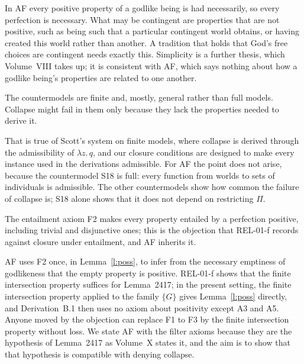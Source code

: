 \documentclass{situationist-preprint}
\begin{document}
\begin{reply}
In AF every positive property of a godlike being is had necessarily, so every perfection is necessary. What may be contingent are properties that are not positive, such as being such that a particular contingent world obtains, or having created this world rather than another. A tradition that holds that God's free choices are contingent needs exactly this. Simplicity is a further thesis, which Volume~VIII takes up; it is consistent with AF, which says nothing about how a godlike being's properties are related to one another.
\end{reply}

\begin{objection}
The countermodels are finite and, mostly, general rather than full models. Collapse might fail in them only because they lack the properties needed to derive it.
\end{objection}

\begin{reply}
That is true of Scott's system on finite models, where collapse is derived through the admissibility of $\lambda z.\,q$, and our closure conditions are designed to make every instance used in the derivations admissible. For AF the point does not arise, because the countermodel S18 is full: every function from worlds to sets of individuals is admissible. The other countermodels show how common the failure of collapse is; S18 alone shows that it does not depend on restricting $\Pi$.
\end{reply}

\begin{objection}
The entailment axiom F2 makes every property entailed by a perfection positive, including trivial and disjunctive ones; this is the objection that REL-01-f records against closure under entailment, and AF inherits it.
\end{objection}

\begin{reply}
AF uses F2 once, in Lemma~\ref{l:poss}, to infer from the necessary emptiness of godlikeness that the empty property is positive. REL-01-f shows that the finite intersection property suffices for Lemma~2417; in the present setting, the finite intersection property applied to the family $\{G\}$ gives Lemma~\ref{l:poss} directly, and Derivation~B.1 then uses no axiom about positivity except A3 and A5. Anyone moved by the objection can replace F1 to F3 by the finite intersection property without loss. We state AF with the filter axioms because they are the hypothesis of Lemma~2417 as Volume~X states it, and the aim is to show that that hypothesis is compatible with denying collapse.
\end{reply}
\end{document}
